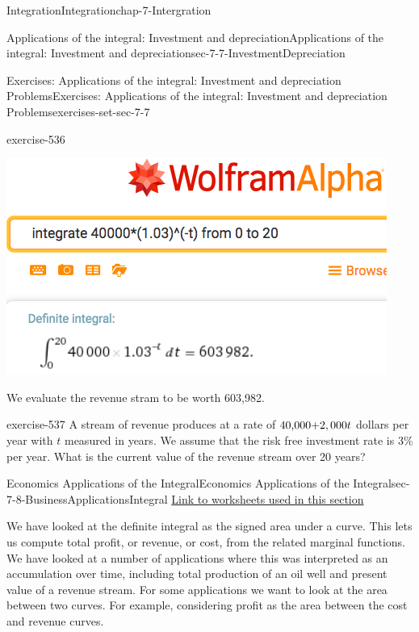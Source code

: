 \documentclass[oneside,10pt,]{book}
\numberwithin{equation}{section}
\begin{document}
\begin{chapterptx}{Integration}{}{Integration}{}{}{chap-7-Intergration}
\begin{sectionptx}{Applications of the integral: Investment and depreciation}{}{Applications of the integral: Investment and depreciation}{}{}{sec-7-7-InvestmentDepreciation}
\begin{exercises-subsection-numberless}{Exercises: Applications of the integral: Investment and depreciation Problems}{}{Exercises: Applications of the integral: Investment and depreciation Problems}{}{}{exercises-set-sec-7-7}
\begin{divisionexercise}{7}{}{}{exercise-536}
\begin{sidebyside}{1}{0.1}{0.1}{0}
\begin{sbspanel}{0.8}
\includegraphics[width=1\linewidth]{images/sec7-7-sol7a.png}
\end{sbspanel}%
\end{sidebyside}%
\par
\hypertarget{p-3066}{}%
We evaluate the revenue stram to be worth \textdollar{}603,982.%
\end{divisionexercise}%
\begin{divisionexercise}{8}{}{}{exercise-537}%
\hypertarget{p-3067}{}%
A stream of revenue produces at a rate of \($40,000+$2,000t\) dollars per year with \(t\) measured in years.  We assume that the risk free investment rate is 3\% per year.  What is the current value of the revenue stream over 20 years?%
\end{divisionexercise}%
\end{exercises-subsection-numberless}
\end{sectionptx}
%
%
\typeout{************************************************}
\typeout{************************************************}
%
\begin{sectionptx}{Economics Applications of the Integral}{}{Economics Applications of the Integral}{}{}{sec-7-8-BusinessApplicationsIntegral}
\hypertarget{p-3068}{}%
\href{./Examples/Section-7-8-Examples.xlsx}{Link to worksheets used in this section}%
\par
\hypertarget{p-3069}{}%
We have looked at the definite integral as the signed area under a curve.  This lets us compute total profit, or revenue, or cost, from the related marginal functions.  We have looked at a number of applications where this was interpreted as an accumulation over time, including total production of an oil well and present value of a revenue stream.  For some applications we want to look at the area between two curves. For example, considering profit as the area between the cost and revenue curves.%

\end{sectionptx}
\end{chapterptx}
\end{document}
